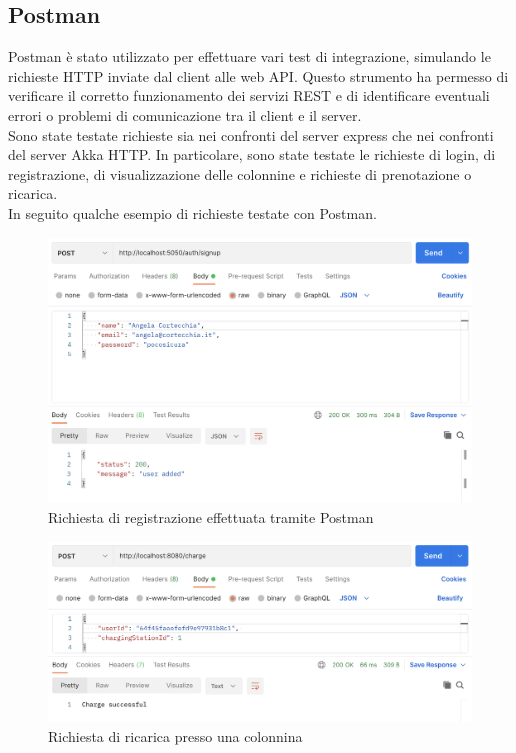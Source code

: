 \subsection{Postman}
Postman è stato utilizzato per effettuare vari test di integrazione, simulando le richieste
HTTP inviate dal client alle web API. Questo strumento ha permesso di verificare il corretto
funzionamento dei servizi REST e di identificare eventuali errori o problemi di comunicazione
tra il client e il server.\\

Sono state testate richieste sia nei confronti del server express che nei confronti del server
Akka HTTP. In particolare, sono state testate le richieste di login, di registrazione,
di visualizzazione delle colonnine e richieste di prenotazione o ricarica.\\

In seguito qualche esempio di richieste testate con Postman.

\begin{figure}[htbp]
    \centering
    \includegraphics[width=\textwidth]{images/signupPostman.png}
    \caption{Richiesta di registrazione effettuata tramite Postman}
    \label{fig:signupPostman}
\end{figure}

\begin{figure}[htbp]
    \centering
    \includegraphics[width=\textwidth]{images/askCharge.png}
    \caption{Richiesta di ricarica presso una colonnina}
    \label{fig:askCharge}
\end{figure}

